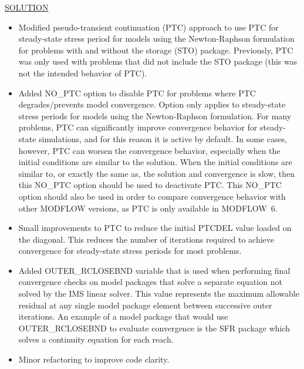 	\underline{SOLUTION}
	\begin{itemize}
		\item Modified pseudo-transient continuation (PTC) approach to use PTC for steady-state stress period for models using the Newton-Raphson formulation for problems with and without the storage (STO) package. Previously, PTC was only used with problems that did not include the STO package (this was not the intended behavior of PTC).
		\item Added NO\_PTC option to disable PTC for problems where PTC degrades/prevents model convergence. Option only applies to steady-state stress periods for models using the Newton-Raphson formulation. For many problems, PTC can significantly improve convergence behavior for steady-state simulations, and for this reason it is active by default.  In some cases, however, PTC can worsen the convergence behavior, especially when the initial conditions are similar to the solution.  When the initial conditions are similar to, or exactly the same as, the solution and convergence is slow, then this NO\_PTC option should be used to deactivate PTC.  This NO\_PTC option should also be used in order to compare convergence behavior with other MODFLOW versions, as PTC is only available in MODFLOW~6. 
		\item Small improvements to PTC to reduce the initial PTCDEL value loaded on the diagonal. This reduces the number of iterations required to achieve convergence for steady-state stress periods for most problems.
		\item Added OUTER\_RCLOSEBND variable that is used when performing final convergence checks on model packages that solve a separate equation not solved by the IMS linear solver. This value represents the maximum allowable residual at any single model package element between successive outer iterations. An example of a model package that would use OUTER\_RCLOSEBND to evaluate convergence is the SFR package which solves a continuity equation for each reach.
		\item Minor refactoring to improve code clarity.
	\end{itemize}
	

